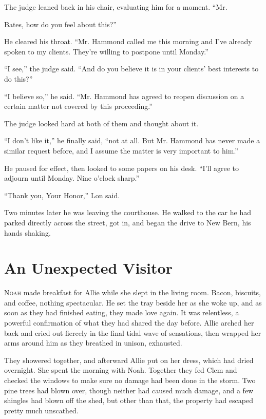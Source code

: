 \documentclass[10pt, twoside, openright]{book}
\newcommand{\chapterornament}[1]{\def\currentornament{#1}}
\def\currentornament{}
\begin{document}
The judge leaned back in his chair, evaluating him for a moment. ``Mr.


Bates, how do you feel about this?''

He cleared his throat. ``Mr. Hammond called me this morning and I've
already spoken to my clients. They're willing to postpone until
Monday.''

``I see,'' the judge said. ``And do you believe it is in your clients'
best interests to do this?''

``I believe so,'' he said. ``Mr. Hammond has agreed to reopen discussion
on a certain matter not covered by this proceeding.''


The judge looked hard at both of them and thought about it.


``I don't like it,'' he finally said, ``not at all. But Mr. Hammond has
never made a similar request before, and I assume the matter is very
important to him.''

He paused for effect, then looked to some papers on his desk. ``I'll
agree to adjourn until Monday. Nine o'clock sharp.''


``Thank you, Your Honor,'' Lon said.


Two minutes later he was leaving the courthouse. He walked to the car he
had parked directly across the street, got in, and began the drive to
New Bern, his hands shaking.

\chapterornament{89}
\chapter{An Unexpected Visitor}

\lettrine[findent=0.5em, nindent=0.0em]{N}{oah} made breakfast for Allie while she slept in the living room. Bacon,
biscuits, and coffee, nothing spectacular. He set the tray beside her as
she woke up, and as soon as they had finished eating, they made love
again. It was relentless, a powerful confirmation of what they had
shared the day before. Allie arched her back and cried out fiercely in
the final tidal wave of sensations, then wrapped her arms around him as
they breathed in unison, exhausted.

They showered together, and afterward Allie put on her dress, which had
dried overnight. She spent the morning with Noah. Together they fed Clem
and checked the windows to make sure no damage had been done in the
storm. Two pine trees had blown over, though neither had caused much
damage, and a few shingles had blown off the shed, but other than that,
the property had escaped pretty much unscathed.
\end{document}
